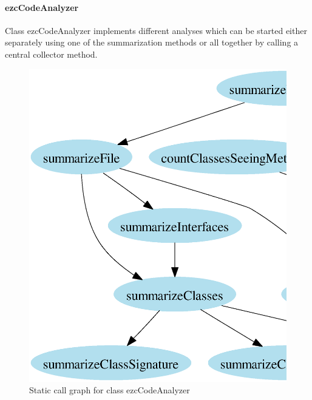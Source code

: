 \documentclass[10pt,final,a4paper,oneside]{article}
\begin{document}
\paragraph{ezcCodeAnalyzer}
Class ezcCodeAnalyzer
implements different analyses which can be started either
separately using one of the summarization methods
or all together by calling a central collector method.

\begin{figure}[htbp]
	\centering
		\includegraphics[width=1.00\textwidth]{figures/callgraph-code_analyzer.ps}
	\caption{Static call graph for class ezcCodeAnalyzer}
	\label{fig:callgraph-code_analyzer}
\end{figure}
\end{document}
